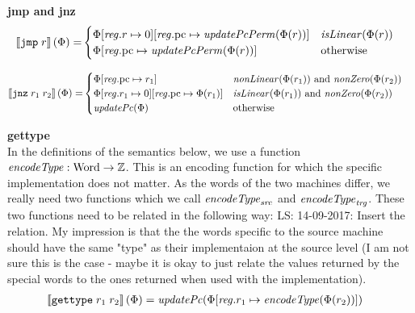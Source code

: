 \documentclass[a4paper]{article}
\newcommand\lau[1]{{\color{purple} \sf \footnotesize {LS: #1}}\\}
\newcommand{\sem}[1]{\left\llbracket #1 \right\rrbracket}
\newcommand{\totherwise}{\text{otherwise }}
\newcommand{\targetcolor}[1]{\color{black}}
\newcommand{\trg}[1]{{\targetcolor{} #1}}
\newcommand{\zinstr}[1]{\texttt{#1}}
\newcommand{\oneinstr}[2]{
  \ifthenelse{\equal{#2}{}}
  {\zinstr{#1}}
  {\zinstr{#1} \; #2}
}
\newcommand{\twoinstr}[3]{
  \ifthenelse{\equal{#2#3}{}}
  {\zinstr{#1}}
  {\zinstr{#1} \; #2 \; #3}
}
\newcommand{\tjmp}[1]{\oneinstr{\trg{jmp}}{#1}}
\newcommand{\tjnz}[2]{\twoinstr{\trg{jnz}}{#1}{#2}}
\newcommand{\tisptr}[2]{\twoinstr{\trg{gettype}}{#1}{#2}}
\newcommand{\ints}{\mathbb{Z}}
\newcommand{\update}[2]{[#1 \mapsto #2]}
\newcommand{\updReg}[2]{\update{\reg.#1}{#2}}
\newcommand{\shareddom}[1]{\mathrm{#1}}
\newcommand{\Word}{\shareddom{Word}}
\newcommand{\var}[1]{\mathit{#1}}
\newcommand{\reg}{\var{reg}}
\newcommand{\pcreg}{\mathrm{pc}}
\newcommand{\plainfun}[2]{
  \ifthenelse{\equal{#2}{}}
  {\mathit{#1}}
  {\mathit{#1}(#2)}
}
\newcommand{\encType}[1]{\plainfun{encodeType}{#1}}
\newcommand{\updPcAddr}[1]{\plainfun{updatePc}{#1}}
\newcommand{\updPcPerm}[1]{\plainfun{updatePcPerm}{#1}}
\newcommand{\nonLinear}[1]{\plainfun{nonLinear}{#1}}
\newcommand{\isLinear}[1]{\plainfun{isLinear}{#1}}
\newcommand{\nonZero}[1]{\plainfun{nonZero}{#1}}
\begin{document}
\noindent\textbf{jmp and jnz}\\
\begin{align*}
  \sem{\tjmp{r}}(\Phi) = &  
                     \begin{cases}
                       \Phi\updReg{r}{0}\updReg{\pcreg}{\updPcPerm{\Phi(r)}} & \isLinear{\Phi(r)} \\
                       \Phi\updReg{\pcreg}{\updPcPerm{\Phi(r)}} & \totherwise
                     \end{cases}
\end{align*}

\begin{align*}
  \sem{\tjnz{r_1}{r_2}}(\Phi) = &       
                             \begin{cases}
                               \Phi\updReg{\pcreg}{r_1} & \text{$\nonLinear{\Phi(r_1)}$ and $\nonZero{\Phi(r_2)}$} \\
                               \Phi\updReg{r_1}{0}\updReg{\pcreg}{\Phi(r_1)}
                                               & \text{$\isLinear{\Phi(r_1)}$ and $\nonZero{\Phi(r_2)}$}\\
                               \updPcAddr{\Phi} & \totherwise
                             \end{cases}
\end{align*}

\noindent\textbf{gettype}\\
In the definitions of the semantics below, we use a function $\encType{} : \Word \rightarrow \ints$. This is an encoding function for which the specific implementation does not matter. As the words of the two machines differ, we really need two functions which we call $\encType{}_{\var{src}}$ and $\encType{}_{\var{trg}}$. These two functions need to be related in the following way:
\lau{14-09-2017: Insert the relation. My impression is that the the words specific to the source machine should have the same "type" as their implementaion at the source level (I am not sure this is the case - maybe it is okay to just relate the values returned by the special words to the ones returned when used with the implementation). }
\begin{align*}
  \sem{\tisptr{r_1}{r_2}}(\Phi) = & \; \updPcAddr{}(\Phi\updReg{r_1}{\encType{\Phi(r_2)}})
\end{align*}
\end{document}
